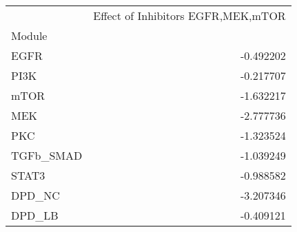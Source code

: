 \begin{tabular}{lr}
\toprule
{} &  Effect of Inhibitors EGFR,MEK,mTOR \\
Module    &                                     \\
\midrule
EGFR      &                           -0.492202 \\
PI3K      &                           -0.217707 \\
mTOR      &                           -1.632217 \\
MEK       &                           -2.777736 \\
PKC       &                           -1.323524 \\
TGFb\_SMAD &                           -1.039249 \\
STAT3     &                           -0.988582 \\
DPD\_NC    &                           -3.207346 \\
DPD\_LB    &                           -0.409121 \\
\bottomrule
\end{tabular}
